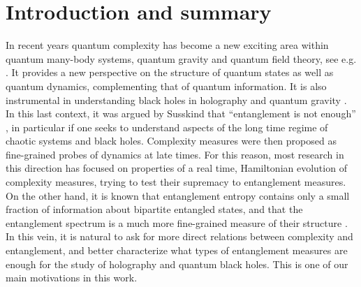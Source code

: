 \documentclass[aps,prl,twocolumn,showpacs,preprintnumbers,amsmath,amssymb]{revtex4-1}
\begin{document}
\section*{Introduction and summary}
In recent years quantum complexity has become a new exciting area within quantum many-body systems, quantum gravity and quantum field theory, see e.g. \cite{Aaronson,Chen:2021lnq,Chapman:2021jbh}. It provides a new perspective on the structure of quantum states as well as quantum dynamics, complementing that of quantum information. It is also instrumental in understanding black holes in holography \cite{Ma} and quantum gravity \cite{Harlow:2013tf,Susskind,Stanford:2014jda,Brown:2015bva}. In this last context, it was argued by Susskind that ``entanglement is not enough'' \cite{Susskind:2014moa}, in particular if one seeks to understand aspects of the long time regime of chaotic systems and black holes. Complexity measures were then proposed as fine-grained probes of dynamics at late times. For this reason, most research in this direction has focused on properties of a real time, Hamiltonian evolution of complexity measures, trying to test their supremacy to entanglement measures. On the other hand, it is known that entanglement entropy contains only a small fraction of information about bipartite entangled states, and that the entanglement spectrum is a much more fine-grained measure of their structure \cite{LiHaldane:2008}. In this vein, it is natural to ask for more direct relations between complexity and entanglement, and better characterize what types of entanglement measures are enough for the study of holography and quantum black holes. This is one of our main motivations in this work.
\end{document}
